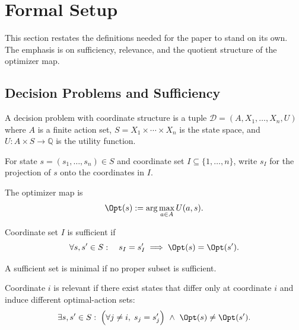 \section{Formal Setup}\label{sec:formal-setup}

This section restates the definitions needed for the paper to stand on its own. The emphasis is on sufficiency, relevance, and the quotient structure of the optimizer map.

\subsection{Decision Problems and Sufficiency}

\begin{definition}\label{def:decision-problem}
A decision problem with coordinate structure is a tuple $\mathcal{D}=(A,X_1,\ldots,X_n,U)$ where $A$ is a finite action set, $S=X_1 \times \cdots \times X_n$ is the state space, and $U : A \times S \to \mathbb{Q}$ is the utility function.
\end{definition}

\begin{definition}[Projection]\label{def:projection}
For state $s=(s_1,\ldots,s_n)\in S$ and coordinate set $I \subseteq \{1,\ldots,n\}$, write $s_I$ for the projection of $s$ onto the coordinates in $I$.
\end{definition}

\begin{definition}\label{def:optimizer}
The optimizer map is
\[
\Opt(s) := \arg\max_{a \in A} U(a,s).
\]
\end{definition}

\begin{definition}\label{def:sufficient}
Coordinate set $I$ is sufficient if
\[
\forall s,s' \in S:\quad s_I=s'_I \implies \Opt(s)=\Opt(s').
\]
\end{definition}

\begin{definition}\label{def:minimal-sufficient}
A sufficient set is minimal if no proper subset is sufficient.
\end{definition}

\begin{definition}\label{def:relevant}
Coordinate $i$ is relevant if there exist states that differ only at coordinate $i$ and induce different optimal-action sets:
\[
\exists s,s' \in S:\;
\Big(\forall j \neq i,\; s_j=s'_j\Big)
\ \wedge\
\Opt(s)\neq\Opt(s').
\]
\end{definition}

